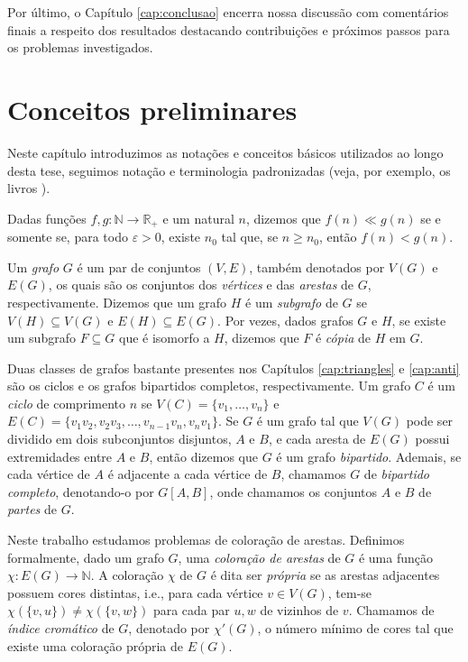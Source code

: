 \documentclass[12pt,a4paper]{book}
\let\epsilon\varepsilon
\begin{document}
Por último, o Capítulo \ref{cap:conclusao} encerra nossa discussão com comentários finais a respeito dos resultados destacando contribuições e próximos passos para os problemas investigados. 

\chapter[Conceitos preliminares]{Conceitos preliminares}
\label{cap:prelim}

Neste capítulo introduzimos as notações e conceitos básicos utilizados ao longo desta tese, seguimos notação e terminologia padronizadas (veja, por exemplo, os livros \cite{diestel10:_graph_theor, janson00:_random_graph}).

Dadas funções $f, g : \mathbb{N} \rightarrow \mathbb{R}_+$ e um natural $n$, dizemos que $f(n) \ll g(n)$
se e somente se, para
todo $\epsilon > 0$, existe $n_0$ tal que, se $n \geq n_0$, então $f(n) < g(n)$.

Um \textit{grafo} $G$ é um par de conjuntos $(V,E)$, também denotados por $V(G)$ e $E(G)$, os quais são
os conjuntos dos \textit{vértices} e das \textit{arestas} de $G$, respectivamente.
Dizemos que um grafo $H$ é um \textit{subgrafo} de $G$
se $V(H) \subseteq V(G)$ e $E(H) \subseteq E(G)$. 
Por vezes, dados grafos $G$ e $H$, se existe um subgrafo $F\subseteq G$ que é isomorfo a $H$, dizemos que $F$ é \textit{cópia} de $H$ em $G$. 

Duas classes de grafos bastante presentes nos Capítulos \ref{cap:triangles} e \ref{cap:anti} são os ciclos e os grafos bipartidos completos, respectivamente.
Um grafo $C$ é um \textit{ciclo} de comprimento $n$ se ${V(C)=\{v_1, \ldots, v_n\}}$ e $E(C) = \{v_1v_2, v_2v_3,\ldots, v_{n-1}v_n, v_nv_1\}$.
Se $G$ é um grafo tal que $V(G)$ pode ser dividido em dois subconjuntos disjuntos, $A$ e $B$, e cada
aresta de $E(G)$ possui extremidades entre $A$ e $B$, então dizemos que $G$ é um grafo \textit{bipartido}. 
Ademais, se cada vértice de $A$ é adjacente a cada vértice de $B$, chamamos $G$ de \textit{bipartido completo}, denotando-o por $G[A,B]$, onde chamamos os conjuntos $A$ e $B$ de \textit{partes} de $G$.

Neste trabalho estudamos problemas de coloração de arestas. 
Definimos formalmente, dado um grafo $G$, uma \textit{coloração de arestas} de $G$ é uma função $\chi: E(G) \rightarrow \mathbb{N}$. 
A coloração $\chi$ de $G$ é dita ser \textit{própria} se as arestas adjacentes possuem cores distintas, i.e., para cada vértice $v \in V(G)$, tem-se $\chi(\{v,u\}) \neq \chi(\{v,w\})$ para cada par $u,w$ de vizinhos de $v$.
Chamamos de \textit{índice cromático} de $G$, denotado por $\chi'(G)$, o número mínimo de cores tal que existe uma coloração própria de $E(G)$.
\end{document}
